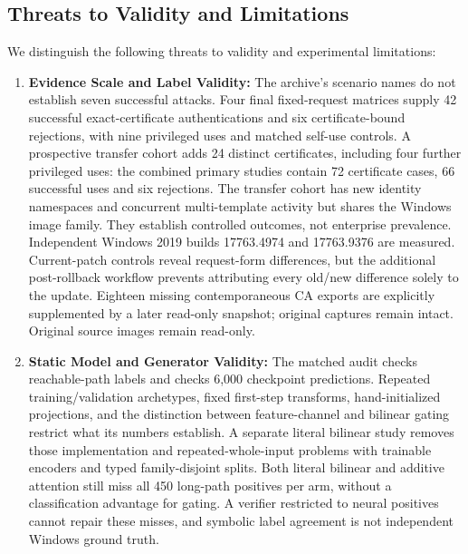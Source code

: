 \subsection{Threats to Validity and Limitations}
We distinguish the following threats to validity and experimental limitations:
\begin{enumerate}
    \item \textbf{Evidence Scale and Label Validity:} The archive's scenario names do not establish seven successful attacks. Four final fixed-request matrices supply 42 successful exact-certificate authentications and six certificate-bound rejections, with nine privileged uses and matched self-use controls. A prospective transfer cohort adds 24 distinct certificates, including four further privileged uses: the combined primary studies contain 72 certificate cases, 66 successful uses and six rejections. The transfer cohort has new identity namespaces and concurrent multi-template activity but shares the Windows image family. They establish controlled outcomes, not enterprise prevalence. Independent Windows 2019 builds 17763.4974 and 17763.9376 are measured. Current-patch controls reveal request-form differences, but the additional post-rollback workflow prevents attributing every old/new difference solely to the update. Eighteen missing contemporaneous CA exports are explicitly supplemented by a later read-only snapshot; original captures remain intact. Original source images remain read-only.
    \item \textbf{Static Model and Generator Validity:} The matched audit checks reachable-path labels and checks 6,000 checkpoint predictions. Repeated training/validation archetypes, fixed first-step transforms, hand-initialized projections, and the distinction between feature-channel and bilinear gating restrict what its numbers establish. A separate literal bilinear study removes those implementation and repeated-whole-input problems with trainable encoders and typed family-disjoint splits. Both literal bilinear and additive attention still miss all 450 long-path positives per arm, without a classification advantage for gating. A verifier restricted to neural positives cannot repair these misses, and symbolic label agreement is not independent Windows ground truth.

\end{enumerate}
